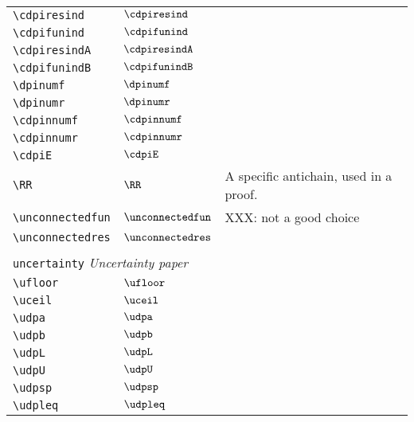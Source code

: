 \begin{longtable}{lll}
 {\color[rgb]{0.5,0.5,0.5}\texttt{\textbackslash cdpiresind}} & $\cdpiresind$ & \\ 
 {\color[rgb]{0.5,0.5,0.5}\texttt{\textbackslash cdpifunind}} & $\cdpifunind$ & \\ 
 {\color[rgb]{0.5,0.5,0.5}\texttt{\textbackslash cdpiresindA}} & $\cdpiresindA$ & \\ 
 {\color[rgb]{0.5,0.5,0.5}\texttt{\textbackslash cdpifunindB}} & $\cdpifunindB$ & \\ 
 {\color[rgb]{0.5,0.5,0.5}\texttt{\textbackslash dpinumf}} & $\dpinumf$ & \\ 
 {\color[rgb]{0.5,0.5,0.5}\texttt{\textbackslash dpinumr}} & $\dpinumr$ & \\ 
 {\color[rgb]{0.5,0.5,0.5}\texttt{\textbackslash cdpinnumf}} & $\cdpinnumf$ & \\ 
 {\color[rgb]{0.5,0.5,0.5}\texttt{\textbackslash cdpinnumr}} & $\cdpinnumr$ & \\ 
 {\color[rgb]{0.5,0.5,0.5}\texttt{\textbackslash cdpiE}} & $\cdpiE$ & \\ 
 {\color[rgb]{0.5,0.5,0.5}\texttt{\textbackslash RR}} & $\RR$ &  A specific antichain, used in a proof.\\ 
 {\color[rgb]{0.5,0.5,0.5}\texttt{\textbackslash unconnectedfun}} & $\unconnectedfun$ &  XXX: not a good choice\\ 
 {\color[rgb]{0.5,0.5,0.5}\texttt{\textbackslash unconnectedres}} & $\unconnectedres$ & \\ 
  &  & \\ 
 \multicolumn{3}{l}{{\color[rgb]{0.5,0.5,0.5}\texttt{uncertainty}} \emph{Uncertainty paper}}\\ 
 \hline
\hline
{\color[rgb]{0.5,0.5,0.5}\texttt{\textbackslash ufloor}} & $\ufloor$ & \\ 
 {\color[rgb]{0.5,0.5,0.5}\texttt{\textbackslash uceil}} & $\uceil$ & \\ 
 {\color[rgb]{0.5,0.5,0.5}\texttt{\textbackslash udpa}} & $\udpa$ & \\ 
 {\color[rgb]{0.5,0.5,0.5}\texttt{\textbackslash udpb}} & $\udpb$ & \\ 
 {\color[rgb]{0.5,0.5,0.5}\texttt{\textbackslash udpL}} & $\udpL$ & \\ 
 {\color[rgb]{0.5,0.5,0.5}\texttt{\textbackslash udpU}} & $\udpU$ & \\ 
 {\color[rgb]{0.5,0.5,0.5}\texttt{\textbackslash udpsp}} & $\udpsp$ & \\ 
 {\color[rgb]{0.5,0.5,0.5}\texttt{\textbackslash udpleq}} & $\udpleq$ & \\ 

\end{longtable}
